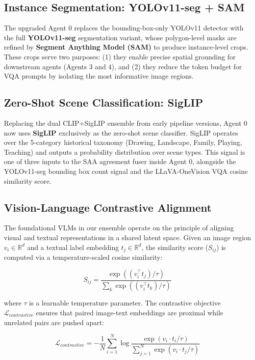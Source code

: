 \documentclass[12pt,onecolumn,a4paper]{IEEEtran}
\begin{document}
\subsection{Instance Segmentation: YOLOv11-seg + SAM}
The upgraded Agent 0 replaces the bounding-box-only YOLOv11 detector with the full \textbf{YOLOv11-seg} segmentation variant, whose polygon-level masks are refined by \textbf{Segment Anything Model (SAM)} \cite{sam2023} to produce instance-level crops. These crops serve two purposes: (1) they enable precise spatial grounding for downstream agents (Agents 3 and 4), and (2) they reduce the token budget for VQA prompts by isolating the most informative image regions.

\subsection{Zero-Shot Scene Classification: SigLIP}
Replacing the dual CLIP+SigLIP ensemble from early pipeline versions, Agent 0 now uses \textbf{SigLIP} \cite{siglip2023} exclusively as the zero-shot scene classifier. SigLIP operates over the 5-category historical taxonomy (Drawing, Landscape, Family, Playing, Teaching) and outputs a probability distribution over scene types. This signal is one of three inputs to the SAA agreement fuser inside Agent 0, alongside the YOLOv11-seg bounding box count signal and the LLaVA-OneVision VQA cosine similarity score.

\subsection{Vision-Language Contrastive Alignment}
The foundational VLMs in our ensemble operate on the principle of aligning visual and textual representations in a shared latent space. Given an image region $v_i \in \mathbb{R}^d$ and a textual label embedding $t_j \in \mathbb{R}^d$, the similarity score ($S_{ij}$) is computed via a temperature-scaled cosine similarity:

\begin{equation}
    S_{ij} = \frac{\exp((v_i^\top t_j)/\tau)}{\sum_{k} \exp((v_i^\top t_k)/\tau)}
\end{equation}

where $\tau$ is a learnable temperature parameter. The contrastive objective $\mathcal{L}_{contrastive}$ ensures that paired image-text embeddings are proximal while unrelated pairs are pushed apart:

\begin{equation}
    \mathcal{L}_{contrastive} = -\frac{1}{N} \sum_{i=1}^{N} \log \frac{\exp(v_i \cdot t_i / \tau)}{\sum_{j=1}^{N} \exp(v_i \cdot t_j / \tau)}
\end{equation}
\end{document}
